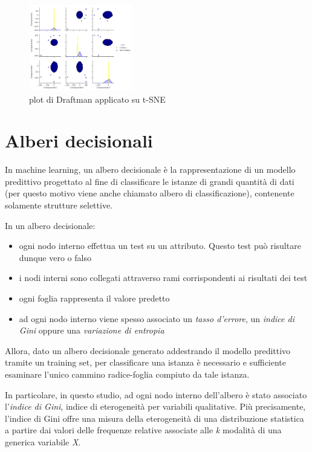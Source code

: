 \documentclass[11pt,a4paper,twocolumn]{article}
\begin{document}
	\begin{figure}[H]
		\centering
		\includegraphics[width=0.4\textwidth]{img/tSNE_SPLOM.png}
		\caption{plot di Draftman applicato su t-SNE}
	\end{figure}


\section{Alberi decisionali}
In machine learning, un albero decisionale è la rappresentazione di un modello predittivo progettato al fine di classificare le istanze di grandi quantità di dati (per questo motivo viene anche chiamato albero di classificazione), contenente solamente strutture selettive.\par
In un albero decisionale:
\begin{itemize}
	\item ogni nodo interno effettua un test su un attributo. Questo test può risultare dunque vero o falso
	\item i nodi interni sono collegati attraverso rami corrispondenti ai risultati dei test
	\item ogni foglia rappresenta il valore predetto
	\item ad ogni nodo interno viene spesso associato un \emph{tasso d'errore}, un \emph{indice di Gini} oppure una \emph{variazione di entropia}
\end{itemize}
Allora, dato un albero decisionale generato addestrando il modello predittivo tramite un training set, per classificare una istanza è necessario e sufficiente esaminare l'unico cammino radice-foglia compiuto da tale istanza.\par
In particolare, in questo studio, ad ogni nodo interno dell'albero è stato associato l'\emph{indice di Gini}, indice di eterogeneità per variabili qualitative. Più precisamente, l'indice di Gini offre una misura della eterogeneità di una distribuzione statistica a partire dai valori delle frequenze relative associate alle \emph{k} modalità di una generica variabile \emph{X}.
\end{document}
